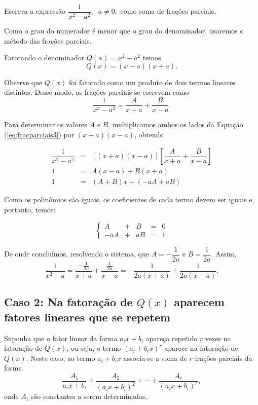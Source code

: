 \begin{exem}
    Escreva a expressão $\dfrac{1}{x^2 - a^2}, \; \; a \neq 0,$ como soma de frações parciais.

    Como o grau do numerador é menor que o grau do denominador, usaremos o método das frações parciais.

    Fatorando o denominador $Q(x) = x^2 - a^2$ temos $$Q(x) = (x-a)(x + a).$$

    Observe que $Q(x)$ foi fatorado como um produto de dois termos lineares distintos. Desse modo, as frações parciais se escrevem como 
    \begin{equation}
    \label{eq:fracparciais3}
    \dfrac{1}{x^2 - a^2} = \dfrac{A}{x+a} + \dfrac{B}{x-a}.
    \end{equation}

    Para determinar os valores $A$ e $B$, multiplicamos ambos os lados da Equação (\ref{eq:fracparciais3}) por $(x+a)(x-a)$, obtendo

    \begin{eqnarray*}
    [(x+a)(x-a)]\dfrac{1}{x^2 -a^2} & = & [(x+a)(x-a)] \left[\dfrac{A}{x+a} + \dfrac{B}{x-a}\right]\\[5pt]
    1 & =& A(x-a) + B(x+a)\\[5pt]
    1 & =& (A + B)x + (-aA + aB)
    \end{eqnarray*}

    Como os polinômios são iguais, os coeficientes de cada termo devem ser iguais e, portanto, temos:

    \begin{equation*}
    \left\{ \begin{array}{ccccc} A & + & B &=& 0 \\[5pt]
    -aA & + & aB & =& 1
    \end{array}
    \right.    
    \end{equation*}

    De onde concluímos, resolvendo o sistema, que $A = -\dfrac{1}{2a}$ e $B = \dfrac{1}{2a}$. Assim, $$\dfrac{1}{x^2 - a} = \dfrac{-\frac{1}{2a}}{x+a} + \dfrac{\frac{1}{2a}}{x-a}  = -\dfrac{1}{2a(x+a)} +\dfrac{1}{2a(x-a)}.$$
\end{exem}

\subsection{Caso 2: Na fatoração de $Q(x)$ aparecem fatores lineares que se repetem}

Suponha que o fator linear da forma $a_i x + b_i$ apareça repetido $r$ vezes na fatoração de $Q(x)$, ou seja, o termo $(a_i + b_i x)^r$ aparece na fatoração de $Q(x)$. Neste caso, ao termo $a_i + b_i x$ associa-se a soma de $r$ frações parciais da forma
$$\dfrac{A_1}{a_i x+b_i} + \dfrac{A_2}{(a_i x+b_i)^2} + \cdots + \dfrac{A_r}{(a_i x+b_i)^r},$$
onde $A_i$ são constantes a serem determinadas.


